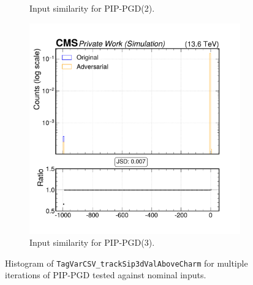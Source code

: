 \begin{figure}[h]
\begin{subfigure}[t]{0.32\textwidth}
    \caption*{Input similarity for PIP-PGD(2).}
  \end{subfigure}\hfill
  \begin{subfigure}[t]{0.32\textwidth}
    \includegraphics[width=\linewidth]{media/output/features/compare/combined_it_3/cmp_global_features_TagVarCSV_trackSip3dValAboveCharm.pdf}
    \caption*{Input similarity for PIP-PGD(3).}
  \end{subfigure}

  \caption*{Histogram of \texttt{TagVarCSV\_trackSip3dValAboveCharm} for multiple iterations of PIP-PGD tested against nominal inputs.}
  \label{fig:combined_input_TagVarCSV_trackSip3dValAboveCharm}
\end{figure}

